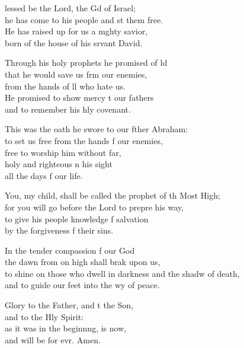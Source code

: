 \begin{psalmverse}
  \begin{patverse}
lessed be the Lord, the Gd of Israel;\Med\\
he has come to his people and st them free.\\
He has raised up for us a m\pointup{\i}ghty savior,\Med\\
born of the house of his srvant David.

Through his holy prophets he promised of ld\Flex\\
that he would save us frm our enemies,\Med\\
from the hands of ll who hate us.\\
He promised to show mercy t our fathers\Med\\
and to remember his hly covenant.

This was the oath he swore to our fther Abraham:\Med\\
to set us free from the hands f our enemies,\\
free to worship him without far,\Flex\\
holy and righteous \pointup{\i}n his sight\Med\\
all the days f our life.

You, my child, shall be called the prophet of th Most High;\Med\\
for you will go before the Lord to prepre his way,\\
to give his people knowledge f salvation\Med\\
by the forgiveness f their sins.

In the tender compassion f our God\Med\\
the dawn from on high shall brak upon us,\\
to shine on those who dwell in darkness and the shadw of death,\Med\\
and to guide our feet into the wy of peace.

Glory to the Father, and t the Son,\Med\\
and to the Hly Spirit:\\
as it was in the beginn\pointup{\i}ng, is now,\Med\\
and will be for evr. Amen.
  \end{patverse}
  \end{psalmverse}
